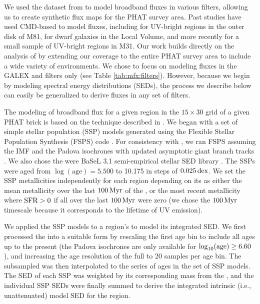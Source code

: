 \documentclass[iop, tighten]{emulateapj}
\begin{document}
We used the \sfh{} dataset from \citet{Lewis:2014} to model broadband fluxes in
various filters, allowing us to create synthetic flux maps for the PHAT survey
area. Past studies have used CMD-based  to model fluxes, including
\citet{Gogarten:2009} for UV-bright regions in the outer disk of M81,
\citet{Johnson:2013} for dwarf galaxies in the Local Volume, and more recently
\citet{Simones:2014} for a small sample of UV-bright regions in M31. Our work
builds directly on the analysis of \citet{Simones:2014} by extending our
coverage to the entire PHAT survey area to include a wide variety of
environments. We chose to focus on modeling fluxes in the GALEX \fuv{} and
\nuv{} filters only (see Table \ref{tab:mfx:filters}). However, because we
begin by modeling spectral energy distributions (SEDs), the process we describe
below can easily be generalized to derive fluxes in any set of filters.

The modeling of broadband flux for a given region in the $15 \times 30$ grid of
a given PHAT brick is based on the technique described in \citet{Johnson:2013}.
We began with a set of simple stellar population (SSP) models generated using
the Flexible Stellar Population Synthesis (FSPS) code \citep{Conroy:2009,
Conroy:2010}. For consistency with \citet{Lewis:2014}, we ran FSPS assuming the
\citet{Kroupa:2001} IMF and the Padova isochrones \citep{Marigo:2008} with
updated asymptotic giant branch tracks \citep{Girardi:2010}. We also chose the
were BaSeL 3.1 semi-empirical stellar SED library \citep{Westera:2002}. The
SSPs were aged from $\log(\mathrm{age})=5.500$ to 10.175 in steps of
$0.025\,\mathrm{dex}$. We set the SSP metallicities independently for each region
depending on its \sfh{} as either the mean metallicity over the last $100\,\mathrm{Myr}$
of the \sfh{}, or the most recent metallicity where $\mathrm{SFR} > 0$ if all 
over the last $100\,\mathrm{Myr}$ were zero (we chose the $100\,\mathrm{Myr}$ timescale because it
corresponds to the lifetime of UV emission).

We applied the SSP models to a region's \sfh{} to model its integrated SED. We
first processed the \sfh{} into a suitable form by rescaling the first age bin
to include all ages up to the present (the Padova isochrones are only available
for $\log_{10}(\mathrm{age}) \ge 6.60$), and increasing the age resolution of the
full \sfh{} to 20 samples per age bin. The subsampled \sfh{} was then
interpolated to the series of ages in the set of SSP models. The SED of each
SSP was weighted by its corresponding mass from the \sfh{}, and the individual
SSP SEDs were finally summed to derive the integrated intrinsic (i.e.,
unattenuated) model SED for the region.
\end{document}
